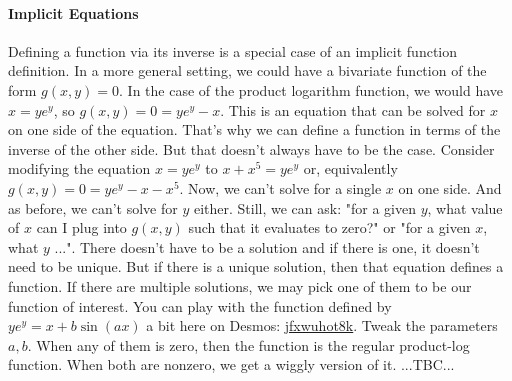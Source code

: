 \paragraph{Implicit Equations}
Defining a function via its inverse is a special case of an implicit function definition. In a more general setting, we could have a bivariate function of the form $g(x,y) = 0$. In the case of the product logarithm function, we would have $x = y e^y$, so $g(x,y) = 0 = y e^y - x$.  This is an equation that can be solved for $x$ on one side of the equation. That's why we can define a function in terms of the inverse of the other side. But that doesn't always have to be the case. Consider modifying the equation $x = y e^y$ to $x + x^5 = y e^y$ or, equivalently $g(x,y) = 0 = y e^y - x - x^5$. Now, we can't  solve for a single $x$ on one side. And as before, we can't solve for $y$ either. Still, we can ask: "for a given $y$, what value of $x$ can I plug into $g(x,y)$ such that it evaluates to zero?" or "for a given $x$, what $y$ ...". There doesn't have to be a solution and if there is one, it doesn't need to be unique. But if there is a unique solution, then that equation defines a function. If there are multiple solutions, we may pick one of them to be our function of interest. You can play with the function defined by $ y e^y = x + b \sin(a x)$ a bit here on Desmos: \href{https://www.desmos.com/calculator/jfxwuhot8k}{jfxwuhot8k}. Tweak the parameters $a,b$. When any of them is zero, then the function is the regular product-log function. When both are nonzero, we get a wiggly version of it. ...TBC...










